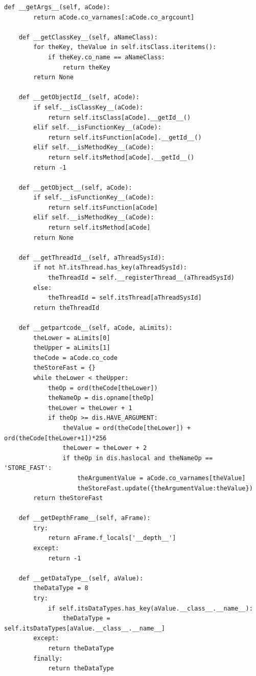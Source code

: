\documentclass[12pt,legalpaper]{report}
\begin{document}
\begin{singlespace}
\begin{lstlisting}[style=Python]
    def __getArgs__(self, aCode):
        return aCode.co_varnames[:aCode.co_argcount]

    def __getClassKey__(self, aNameClass):
        for theKey, theValue in self.itsClass.iteritems():
            if theKey.co_name == aNameClass:
                return theKey
        return None
    
    def __getObjectId__(self, aCode):
        if self.__isClassKey__(aCode):
            return self.itsClass[aCode].__getId__()
        elif self.__isFunctionKey__(aCode):
            return self.itsFunction[aCode].__getId__()
        elif self.__isMethodKey__(aCode):
            return self.itsMethod[aCode].__getId__()
        return -1

    def __getObject__(self, aCode):
        if self.__isFunctionKey__(aCode):
            return self.itsFunction[aCode]
        elif self.__isMethodKey__(aCode):
            return self.itsMethod[aCode]
        return None

    def __getThreadId__(self, aThreadSysId):
        if not hT.itsThread.has_key(aThreadSysId):
            theThreadId = self.__registerThread__(aThreadSysId)
        else:
            theThreadId = self.itsThread[aThreadSysId]
        return theThreadId

    def __getpartcode__(self, aCode, aLimits):
        theLower = aLimits[0]
        theUpper = aLimits[1]
        theCode = aCode.co_code
        theStoreFast = {}    
        while theLower < theUpper:
            theOp = ord(theCode[theLower])
            theNameOp = dis.opname[theOp]
            theLower = theLower + 1
            if theOp >= dis.HAVE_ARGUMENT:
                theValue = ord(theCode[theLower]) + ord(theCode[theLower+1])*256
                theLower = theLower + 2
                if theOp in dis.haslocal and theNameOp == 'STORE_FAST':
                    theArgumentValue = aCode.co_varnames[theValue]
                    theStoreFast.update({theArgumentValue:theValue})
        return theStoreFast

    def __getDepthFrame__(self, aFrame):
        try:
            return aFrame.f_locals['__depth__']
        except:
            return -1
    
    def __getDataType__(self, aValue):
        theDataType = 8
        try:
            if self.itsDataTypes.has_key(aValue.__class__.__name__):
                theDataType = self.itsDataTypes[aValue.__class__.__name__]
        except:
            return theDataType
        finally:
            return theDataType


\end{lstlisting}
\end{singlespace}
\end{document}
